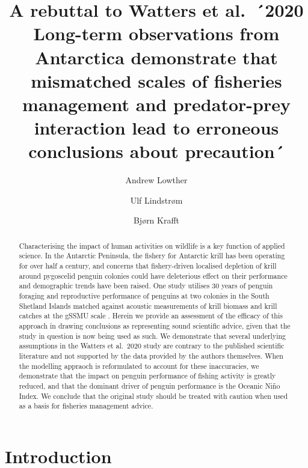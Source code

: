 \documentclass[]{elsarticle} %
\begin{document}
\begin{frontmatter}

  \title{A rebuttal to Watters et al.~´2020 Long-term observations from
Antarctica demonstrate that mismatched scales of fisheries management
and predator-prey interaction lead to erroneous conclusions about
precaution´}
    \author[1]{Andrew Lowther%
  }
  
    \author[2]{Ulf Lindstrøm%
  }
  
    \author[3]{Bjørn Krafft%
  }
  
  
  \begin{abstract}
  Characterising the impact of human activities on wildlife is a key
  function of applied science. In the Antarctic Peninsula, the fishery
  for Antarctic krill has been operating for over half a century, and
  concerns that fishery-driven localised depletion of krill around
  pygoscelid penguin colonies could have deleterious effect on their
  performance and demographic trends have been raised. One study
  utilises 30 years of penguin foraging and reproductive performance of
  penguins at two colonies in the South Shetland Islands matched against
  acoustic measurements of krill biomass and krill catches at the gSSMU
  scale \citep{Watters2020}. Herein we provide an assessment of the
  efficacy of this approach in drawing conclusions as representing sound
  scientific advice, given that the study in question is now being used
  as such. We demonstrate that several underlying assumptions in the
  Watters et al.~2020 study are contrary to the published scientific
  literature and not supported by the data provided by the authors
  themselves. When the modelling appraoch is reformulated to account for
  these inaccuracies, we demonstrate that the impact on penguin
  performance of fishing activity is greatly reduced, and that the
  dominant driver of penguin performance is the Oceanic Niño Index. We
  conclude that the original study should be treated with caution when
  used as a basis for fisheries management advice.
  \end{abstract}
  
 \end{frontmatter}

\section{Introduction}\label{introduction}
\end{document}
